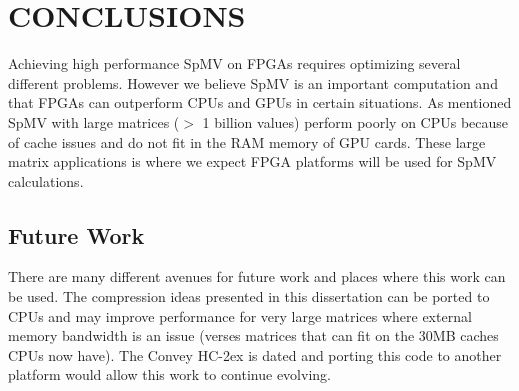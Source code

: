 \chapter{CONCLUSIONS}
\label{chp:conclusion}
Achieving high performance SpMV on FPGAs requires optimizing several different problems. However we believe SpMV is an important computation and that FPGAs can outperform CPUs and GPUs in certain situations. As mentioned SpMV with large matrices ($>$ 1 billion values) perform poorly on CPUs because of cache issues and do not fit in the RAM memory of GPU cards. These large matrix applications is where we expect FPGA platforms will be used for SpMV calculations.
\section{Future Work}
There are many different avenues for future work and places where this work can be used. The compression ideas presented in this dissertation can be ported to CPUs and may improve performance for very large matrices where external memory bandwidth is an issue (verses matrices that can fit on the 30MB caches CPUs now have). The Convey HC-2ex is dated and porting this code to another platform would allow this work to continue evolving.

